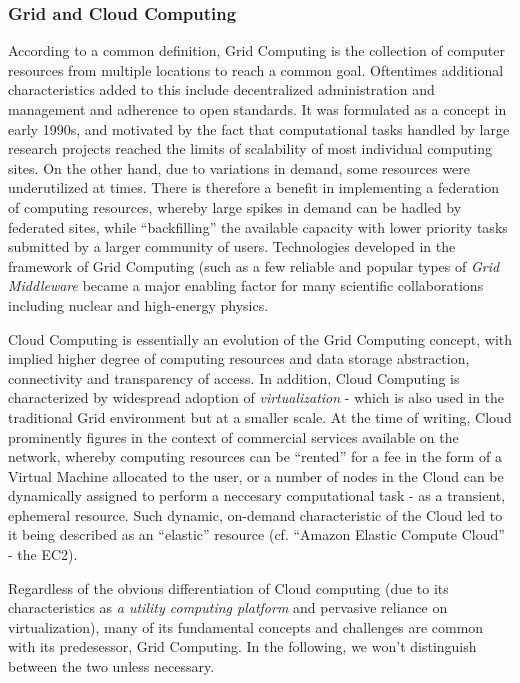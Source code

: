 \subsubsection{Grid and Cloud Computing}
According to a common definition, Grid Computing is the collection of computer resources from multiple locations to reach a common goal. Oftentimes additional characteristics added to this include decentralized
administration and management and adherence to open standards. It was formulated as a concept in early 1990s, and motivated by the fact that computational tasks handled by large research projects reached
the limits of scalability of most individual computing sites. On the other hand, due to variations in demand, some resources were underutilized at times. There is therefore a benefit in implementing a federation of
computing resources, whereby large spikes in demand can be hadled by federated sites, while ``backfilling'' the available capacity with lower priority tasks submitted by a larger community of users.
Technologies developed in the framework of Grid Computing (such as a few reliable and popular types of \textit{Grid Middleware} became a major enabling factor for many scientific collaborations including
nuclear and high-energy physics.

Cloud Computing is essentially an evolution of the Grid Computing concept, with implied higher degree of computing resources and data storage abstraction, connectivity and transparency of access.
In addition, Cloud Computing is characterized by widespread adoption of \textit{virtualization} - which is also used in the traditional Grid environment but at a smaller scale.
At the time of writing, Cloud prominently figures in the context of commercial services available on the network, whereby computing resources can be ``rented'' for a fee in the form of a Virtual Machine allocated
to the user, or a  number of nodes in the Cloud can be dynamically assigned to perform a neccesary computational task - as a transient, ephemeral resource. Such dynamic, on-demand characteristic
of the Cloud led to it being described as an ``elastic'' resource (cf. ``Amazon Elastic Compute Cloud'' - the EC2).

Regardless of the obvious differentiation of Cloud computing (due to its characteristics as \textit{a utility computing platform} and pervasive reliance on virtualization), many of its fundamental concepts and challenges
are common with its predesessor, Grid Computing. In the following, we won't distinguish between the two unless  necessary.


